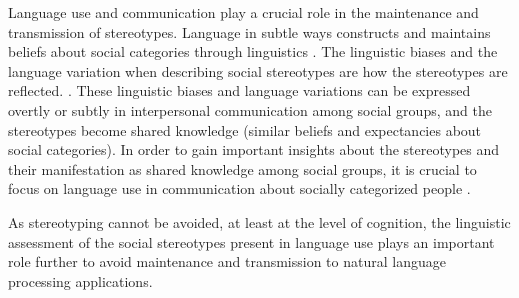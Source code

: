  Language use and communication play a crucial role in the maintenance and transmission of stereotypes. Language in subtle ways constructs and maintains beliefs about social categories through linguistics \cite{beukeboom2019stereotypes}.  The linguistic biases and the language variation when describing social stereotypes are how the stereotypes are reflected. \cite{burgers2020language}. These linguistic biases and language variations can be expressed overtly or subtly in interpersonal communication among social groups, and the stereotypes become shared knowledge (similar beliefs and expectancies about social categories). In order to gain important insights about the stereotypes and their manifestation as shared knowledge among social groups, it is crucial to focus on language use in communication about socially categorized people \cite{beukeboom2019stereotypes}.
 
 
 
 
 
 

As stereotyping cannot be avoided, at least at the level of cognition, the linguistic assessment of the social stereotypes present in language use plays an important role further to avoid maintenance and transmission to natural language processing applications. 

